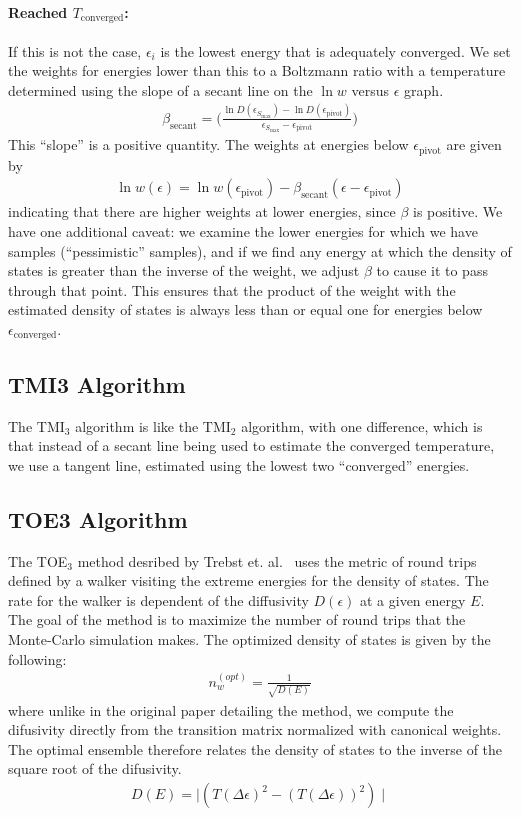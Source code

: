 \documentclass[letterpaper,twocolumn,amsmath,amssymb,pre,aps,10pt]{revtex4-1}
\begin{document}
\paragraph{Reached $T_\text{converged}$:}
If this is not the case, $\epsilon_i$ is the lowest energy that is
adequately converged.  We set the weights for energies lower than this
to a Boltzmann ratio with a temperature determined using the slope of
a secant line on the $\ln w$ versus $\epsilon$ graph.
\begin{align}
  \beta_\text{secant} = \bigg(\frac{\ln{D}(\epsilon_{S_{\max}}) - \ln{D}
  (\epsilon_\text{pivot})}{\epsilon_{S_{\max}}-\epsilon_\text{pivot}}\bigg)
\end{align}
This ``slope'' is a positive quantity.  The weights at energies below
$\epsilon_\text{pivot}$ are given by
\begin{align}
  \ln w(\epsilon) = \ln w(\epsilon_\text{pivot}) -
  \beta_\text{secant}(\epsilon - \epsilon_\text{pivot})
\end{align}
indicating that there are higher weights at lower energies, since
$\beta$ is positive.  We have one additional caveat: we examine the
lower energies for which we have samples (``pessimistic'' samples),
and if we find any energy at which the density of states is greater
than the inverse of the weight, we adjust $\beta$ to cause it to pass
through that point.  This ensures that the product of the weight with
the estimated density of states is always less than or equal one for
energies below $\epsilon_\text{converged}$.

\subsection{TMI3 Algorithm}
The TMI$_3$ algorithm is like the TMI$_2$ algorithm, with one
difference, which is that instead of a secant line being used to
estimate the converged temperature, we use a tangent line, estimated
using the lowest two ``converged'' energies.

\subsection{TOE3 Algorithm}
The TOE$_3$ method desribed by Trebst et. al.~\cite{trebst2004optimizing} uses the metric of round trips defined by a walker visiting the extreme energies for the density of states.  The rate for the walker is dependent of the diffusivity $D(\epsilon)$ at a given energy $E$.  The goal of the method is to maximize the number of round trips that the Monte-Carlo simulation makes.  The optimized density of states is given by the following:
\begin{align}
  n_{w}^{(opt)} = \frac{1}{\sqrt{D(E)}}
\end{align}
where unlike in the original paper detailing the method, we compute the difusivity directly from the transition matrix normalized with canonical weights.  The optimal ensemble therefore relates the density of states to the inverse of the square root of the difusivity.
\begin{align}
  D(E) = \mid (T(\Delta\epsilon)^2 - (T(\Delta\epsilon))^2) \mid
\end{align}
\end{document}
